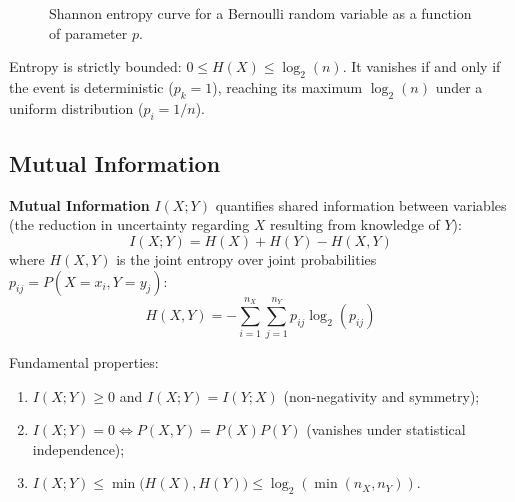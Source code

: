\begin{figure}[htbp]
\centering
{}
\caption{Shannon entropy curve for a Bernoulli random variable as a function of parameter $p$.}
\label{fig:dm-bernoulli-entropy}
\end{figure}

Entropy is strictly bounded: $0 \le H(X) \le \log_2(n)$. It vanishes if and only if the event is deterministic ($p_k = 1$), reaching its maximum $\log_2(n)$ under a uniform distribution ($p_i = 1/n$).

\subsection{Mutual Information}
\textbf{Mutual Information} $I(X; Y)$ quantifies shared information between variables (the reduction in uncertainty regarding $X$ resulting from knowledge of $Y$):
\begin{equation}
    I(X; Y) = H(X) + H(Y) - H(X, Y)
\end{equation}
where $H(X, Y)$ is the joint entropy over joint probabilities $p_{ij} = P(X = x_i, Y = y_j)$:
\begin{equation}
    H(X, Y) = -\sum_{i=1}^{n_X} \sum_{j=1}^{n_Y} p_{ij} \log_2(p_{ij})
\end{equation}

Fundamental properties:
\begin{enumerate}[noitemsep]
    \item $I(X; Y) \ge 0$ and $I(X; Y) = I(Y; X)$ (non-negativity and symmetry);
    \item $I(X; Y) = 0 \iff P(X, Y) = P(X)P(Y)$ (vanishes under statistical independence);
    \item $I(X; Y) \le \min\big(H(X), H(Y)\big) \le \log_2(\min(n_X, n_Y))$.
\end{enumerate}

